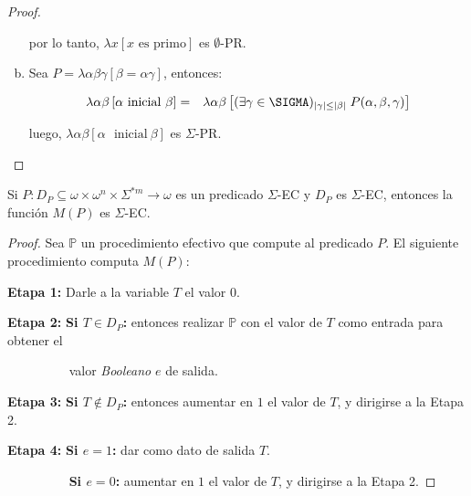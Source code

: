 \begin{proof}
\begin{enumerate}[a)]
        \PN por lo tanto, $\lambda x\left[x \text{ es primo}\right]$ es $\emptyset$-PR.

      \item Sea $P = \lambda \alpha\beta\gamma \left[\beta = \alpha\gamma\right]$, entonces:

        \begin{eqnarray}
          \nonumber \lambda \alpha\beta \left[\alpha \text{\ }\mathrm{ inicial}\ \beta \right] &=& \lambda \alpha\beta
            \left[(\exists \gamma \in \SIGMA)_{\lvert \gamma \rvert \leq \lvert \beta \rvert} \; P(\alpha, \beta,
            \gamma)\right]
        \end{eqnarray}

        \PN luego, $\lambda \alpha\beta \left[\alpha \text{\ }\mathrm{ inicial}\ \beta \right]$ es $\Sigma$-PR.
    \end{enumerate}
  \end{proof}

  \begin{lemma}
    \PN Si $P: D_{P} \subseteq \omega \times \omega^{n} \times \Sigma^{\ast m} \rightarrow \omega$ es un predicado
    $\Sigma$-EC y $ D_{P}$ es $\Sigma$-EC, entonces la función $M(P)$ es $\Sigma$-EC.
  \end{lemma}
  \begin{proof}
    \PN Sea $\mathbb{P}$ un procedimiento efectivo que compute al predicado $P$. El siguiente procedimiento computa
    $M(P)$:

    \vspace{3mm}
    \textbf{Etapa 1:}
    Darle a la variable $T$ el valor $0$.

    \textbf{Etapa 2:}
    \textbf{Si $T \in D_{P}$:} entonces realizar $\mathbb{P}$ con el valor de $T$ como entrada para obtener el

    $\qquad\qquad\;\;\;$valor \textit{Booleano} $e$ de salida.

    \textbf{Etapa 3:}
    \textbf{Si $T \notin D_{P}$:} entonces aumentar en $1$ el valor de $T$, y dirigirse a la Etapa 2.

    \textbf{Etapa 4:}
    \textbf{Si $e=1$:} dar como dato de salida $T$.

    $\qquad\qquad\;\;\;$\textbf{Si $e=0$:} aumentar en $1$ el valor de $T$, y dirigirse a la Etapa 2.
  \end{proof}

